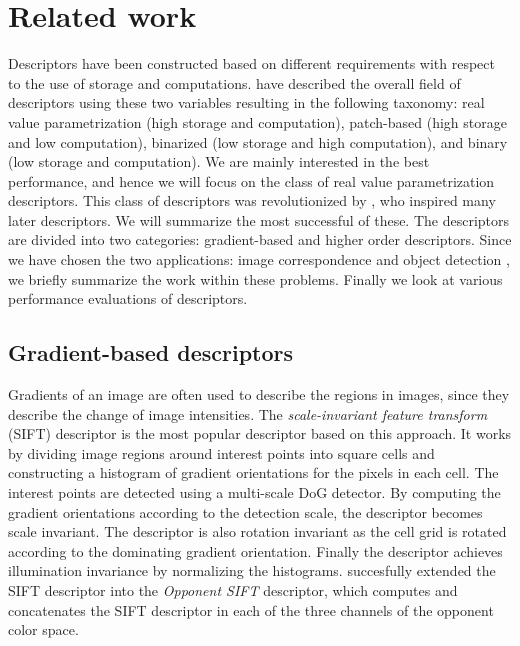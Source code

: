 \documentclass[thesis.tex]{subfiles}
\begin{document}
\chapter{Related work}
Descriptors have been constructed based on different requirements with respect to the use of storage and computations. \citet{heinly2012comparative} have described the overall field of descriptors using these two variables resulting in the following taxonomy: real value parametrization (high storage and computation), patch-based (high storage and low computation), binarized (low storage and high computation), and binary (low storage and computation). We are mainly interested in the best performance, and hence we will focus on the class of real value parametrization descriptors. This class of descriptors was revolutionized by \citet{lowe2004distinctive}, who inspired many later descriptors. We will summarize the most successful of these. The descriptors are divided into two categories: gradient-based and higher order descriptors. Since we have chosen the two applications: image correspondence and object detection , we briefly summarize the work within these problems. Finally we look at various performance evaluations of descriptors. 

\section{Gradient-based descriptors}
\label{sec:gradientDescriptors}
Gradients of an image are often used to describe the regions in images, since they describe the change of image intensities. The \emph{scale-invariant feature transform} (SIFT) descriptor \cite{lowe2004distinctive} is the most popular descriptor based on this approach. It works by dividing image regions around interest points into square cells and constructing a histogram of gradient orientations for the pixels in each cell. The interest points are detected using a multi-scale DoG detector. By computing the gradient orientations according to the detection scale, the descriptor becomes scale invariant. The descriptor is also rotation invariant as the cell grid is rotated according to the dominating gradient orientation. Finally the descriptor achieves illumination invariance by normalizing the histograms. \citet{van2010evaluating} succesfully extended the SIFT descriptor into the \emph{Opponent SIFT} descriptor, which computes and concatenates the SIFT descriptor in each of the three channels of the opponent color space.
\end{document}
